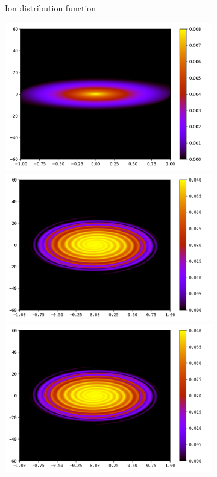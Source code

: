 \documentclass{article}
\numberwithin{equation}{section}
\newcommand{\imh}{\textheight} %
\newcommand{\imw}{\textwidth} %
\begin{document}
\begin{figure}
\begin{subfigure}{\textwidth}
		\caption{Ion distribution function}
		\label{subfig:compT02_ion}
	\end{subfigure}
	\begin{subfigure}{\textwidth}
		\centering
		\includegraphics[height=\imh,width=\imw]{images/feT20_FD.png}
		\includegraphics[height=\imh,width=\imw]{images/feT20_512.png}
		\includegraphics[height=\imh,width=\imw]{images/feT20_512_2.png}

\end{subfigure}
\end{figure}
\end{document}

